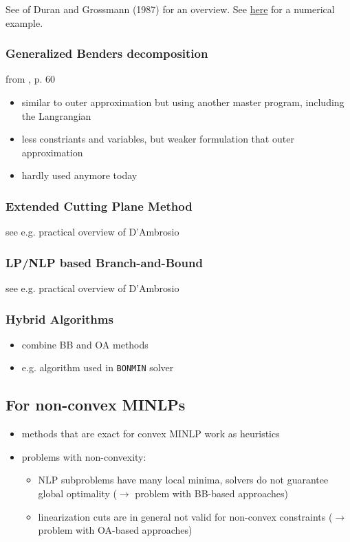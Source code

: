 \documentclass{article}
\begin{document}
\noindent
See \cite{duran1986outer} of Duran and Grossmann (1987) for an overview. See \href{https://optimization.mccormick.northwestern.edu/index.php/Outer-approximation_(OA)}{here} for a numerical example.

\subsubsection{Generalized Benders decomposition}
from \cite{sager2005numerical}, p. 60
\begin{itemize}
\item similar to outer approximation but using another master program, including the Langrangian
\item less constriants and variables, but weaker formulation that outer approximation
\item hardly used anymore today
\end{itemize}

\subsubsection{Extended Cutting Plane Method}
see e.g. practical overview of D'Ambrosio \cite{d2013mixed}
\subsubsection{LP/NLP based Branch-and-Bound}
see e.g. practical overview of D'Ambrosio \cite{d2013mixed}
\subsubsection{Hybrid Algorithms}
\begin{itemize}
\item combine BB and OA methods
\item e.g. algorithm used in \texttt{BONMIN} solver
\end{itemize}
\subsection{For non-convex MINLPs}
\begin{itemize}
\item methods that are exact for convex MINLP work as heuristics
\item problems with non-convexity: 
	\begin{itemize}
	\item NLP subproblems have many local minima, solvers do not guarantee global optimality ($\rightarrow$ problem with BB-based approaches)
	\item linearization cuts are in general not valid for non-convex constraints ($\rightarrow$ problem with OA-based approaches)
	\end{itemize}
\end{itemize}
\end{document}
